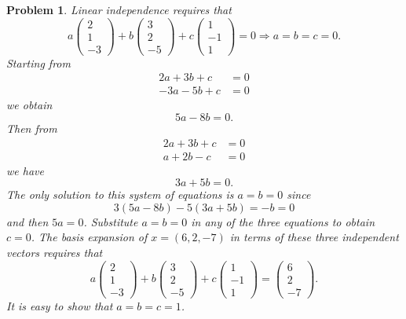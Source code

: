 \documentclass{article}
\theoremstyle{pprop}
\newtheorem{problem}{Problem}[section]
\begin{document}
\begin{problem}
Linear independence requires that 
$$
a\begin{pmatrix}2\\1\\-3 \end{pmatrix}
+
b\begin{pmatrix}3\\2\\-5 \end{pmatrix}
+
c\begin{pmatrix}1\\-1\\1 \end{pmatrix}=0
\Rightarrow a=b=c=0.
$$
Starting from 
\begin{align*}
2a+3b+c & = 0 \\
-3a-5b+c &=0
\end{align*}
we obtain
$$
5a-8b=0.
$$
Then from
\begin{align*}
2a+3b+c & = 0 \\
a+2b-c &=0
\end{align*}
we have
$$
3a+5b=0.
$$
The only solution to this system of equations is $a=b=0$ since
$$
3(5a-8b)-5(3a+5b)=-b=0
$$
and then $5a=0$. Substitute $a=b=0$ in any of the three equations to obtain $c=0$.
The basis expansion of $x=(6,2,-7)$ in terms of these three independent vectors requires that
$$
a\begin{pmatrix}2\\1\\-3 \end{pmatrix}
+
b\begin{pmatrix}3\\2\\-5 \end{pmatrix}
+
c\begin{pmatrix}1\\-1\\1 \end{pmatrix}=
\begin{pmatrix}6\\2\\-7 \end{pmatrix}.
$$
It is easy to show that $a=b=c=1$.
\end{problem}
\end{document}

